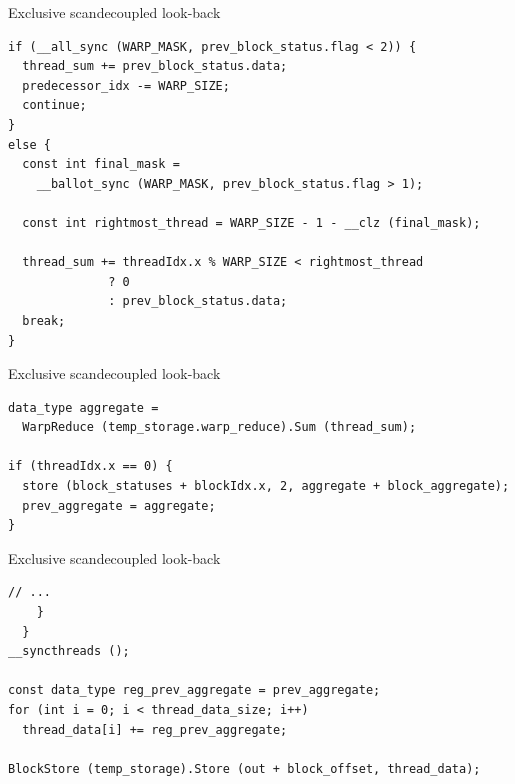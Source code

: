 \documentclass[aspectratio=169,compress]{beamer}
\begin{document}
\begin{frame}[fragile]{Exclusive scan}{decoupled look-back}

\vspace{0.1in}

\begin{lstlisting}[showstringspaces=false]
if (__all_sync (WARP_MASK, prev_block_status.flag < 2)) {
  thread_sum += prev_block_status.data;
  predecessor_idx -= WARP_SIZE;
  continue;
}
else {
  const int final_mask = 
    __ballot_sync (WARP_MASK, prev_block_status.flag > 1);

  const int rightmost_thread = WARP_SIZE - 1 - __clz (final_mask);

  thread_sum += threadIdx.x % WARP_SIZE < rightmost_thread 
              ? 0 
              : prev_block_status.data;
  break;
}
\end{lstlisting}
\end{frame}

\begin{frame}[fragile]{Exclusive scan}{decoupled look-back}

\vspace{0.1in}

\begin{lstlisting}[showstringspaces=false]
data_type aggregate = 
  WarpReduce (temp_storage.warp_reduce).Sum (thread_sum);

if (threadIdx.x == 0) {
  store (block_statuses + blockIdx.x, 2, aggregate + block_aggregate);
  prev_aggregate = aggregate;
}
\end{lstlisting}
\end{frame}

\begin{frame}[fragile]{Exclusive scan}{decoupled look-back}

\vspace{0.1in}

\begin{lstlisting}[showstringspaces=false]
      // ...
    }
  }
__syncthreads ();

const data_type reg_prev_aggregate = prev_aggregate;
for (int i = 0; i < thread_data_size; i++)
  thread_data[i] += reg_prev_aggregate;

BlockStore (temp_storage).Store (out + block_offset, thread_data);
\end{lstlisting}
\end{frame}
\end{document}
